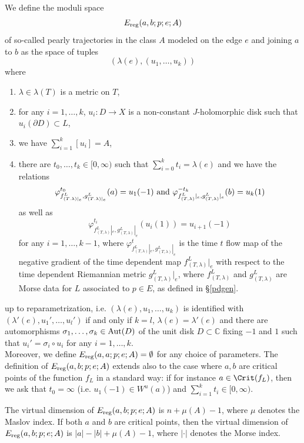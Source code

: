 \begin{dfn}
	We define the moduli space $$E_\textnormal{reg}(a,b;p;e;A)$$ of so-called pearly trajectories in the class $A$ modeled on the edge $e$ and joining $a$ to $b$ as the space of tuples $$\left(\lambda(e),(u_1,\ldots,u_k)\right)$$ where    \begin{enumerate}
		\item $\lambda\in \lambda(T)$ is a metric on $T$,
		\item for any $i=1,\ldots,k$, $u_i:D\to X$ is a non-constant $J$-holomorphic disk such that $u_i(\partial D)\subset L$,
		\item we have $\sum_{i=1}^k [u_i]=A$,
		\item there are $t_0,\ldots,t_k\in [0,\infty)$ such that $\sum_{i=0}^k t_i=\lambda(e)$ and we have the relations $$\varphi_{f^L_{(T.\lambda)|_e},g^L_{(T.\lambda)|_e}}^{t_0}(a)=u_1(-1) \textnormal{   and   } \varphi_{f^L_{(T,\lambda)}|_e,g^L_{(T,\lambda)}|_e}^{-t_k}(b)=u_k(1)$$ as well as $$\varphi_{f^L_{(T,\lambda)}|_e,g^L_{(T,\lambda)}|_e}^{t_i}(u_i(1))=u_{i+1}(-1)$$ for any $i=1,\ldots,k-1$, where $\varphi_{f^L_{(T,\lambda)}|_e,g^L_{(T,\lambda)}|_e}^t$ is the time $t$ flow map of the negative gradient of the time dependent map $f^L_{(T,\lambda)}|_e$ with respect to the time dependent Riemannian metric $g^L_{(T,\lambda)}|_e$, where $f^L_{(T,\lambda)}$ and $g^L_{(T,\lambda)}$ are Morse data for $L$ associated to $p\in E$, as defined in \S \ref{pdgen}.
	\end{enumerate}
	up to reparametrization, i.e. $(\lambda(e),u_1,\ldots,u_k)$ is identified with $(\lambda'(e),u_1',\ldots,u_l')$ if and only if $k=l$, $\lambda(e)=\lambda'(e)$ and there are automorphisms $\sigma_1,\ldots,\sigma_k\in \textnormal{Aut}(D)$ of the unit disk $D\subset \mathbb C$ fixing $-1$ and $1$ such that $u_i'=\sigma_i\circ u_i$ for any $i=1,\ldots,k$.\\  Moreover, we define $E_\textnormal{reg}(a,a;p;e;A)=\emptyset$ for any choice of parameters. The definition of $E_\textnormal{reg}(a,b;p;e;A)$ extends also to the case where $a,b$ are critical points of the function $f_L$ in a standard way: if for instance $a\in \Crit(f_L)$, then we ask that $t_0=\infty$ (i.e. $u_1(-1)\in W^u(a)$) and $\sum_{i=1}^k t_i\in [0,\infty)$.\end{dfn} \noindent The virtual dimension of $E_\textnormal{reg}(a,b;p;e;A)$ is $n+\mu(A)-1$, where $\mu$ denotes the Maslov index.  If both $a$ and $b$ are critical points, then the virtual dimension of $E_\textnormal{reg}(a,b;p;e;A)$ is $|a|-|b|+\mu(A)-1$, where $|\cdot |$ denotes the Morse index.\\

